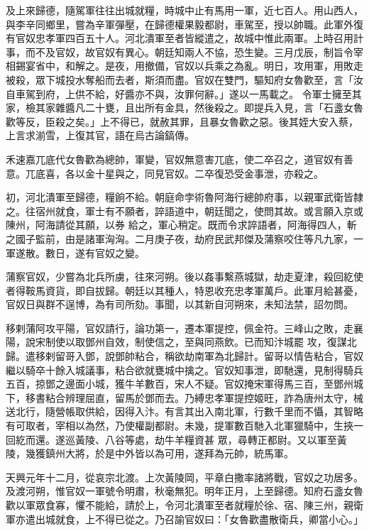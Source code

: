 \begin{pinyinscope}
 及上來歸德，隨駕軍往往出城就糧，時城中止有馬用一軍，近七百人。用山西人，與李辛同鄉里，嘗為辛軍彈壓，在歸德權果毅都尉，車駕至，授以帥職。此軍外復有官奴忠孝軍四百五十人。河北潰軍至者皆縱遣之，故城中惟此兩軍。上時召用計事，而不及官奴，故官奴有異心。朝廷知兩人不協，恐生變。三月戊辰，制旨令宰相錫宴省中，和解之。是夜，用撤備，官奴以兵乘之為亂。明日，攻用軍，用敗走被殺，眾下城投水奪船而去者，斯須而盡。官奴在雙門，驅知府女魯歡至，言「汝自車駕到府，上供不給，好醬亦不與，汝罪何辭。」遂以一馬載之。
 令軍士擁至其家，檢其家雜醬凡二十甕，且出所有金具，然後殺之。即提兵入見，言「石盞女魯歡等反，臣殺之矣。」上不得已，就赦其罪，且暴女魯歡之惡。後其姪大安入蔡，上言求湔雪，上復其官，語在烏古論鎬傳。



 禾速嘉兀底代女魯歡為總帥，軍變，官奴無意害兀底，使二卒召之，道官奴有善意。兀底喜，各以金十星與之，同見官奴。二卒復恐受金事泄，亦殺之。



 初，河北潰軍至歸德，糧餉不給。朝庭命孛術魯阿海行總帥府事，以親軍武衛皆隸之。往宿州就食，軍士有不願者，誶語道中，朝廷聞之，使問其故。或言願入京或陳州，阿海請從其願，以券
 給之，軍心稍定。既而令求誶語者，阿海得四人，斬之國子監前，由是諸軍洶洶。二月庚子夜，劫府民武邦傑及蒲察咬住等凡九家，一軍遂散。數日，遂有官奴之變。



 蒲察官奴，少嘗為北兵所虜，往來河朔。後以姦事繫燕城獄，劫走夏津，殺回紇使者得鞍馬資貨，即自拔歸。朝廷以其種人，特恩收充忠孝軍萬戶。此軍月給甚憂，官奴日與群不逞博，為有司所劾。事聞，以其新自河朔來，未知法禁，詔勿問。



 移剌蒲阿攻平陽，官奴請行，論功第一，遷本軍提控，佩金符。三峰山之敗，走襄陽，說宋制使以取鄧州自效，制使信之，至與同燕飲。已而知汴城罷
 攻，復謀北歸。遣移剌留哥入鄧，說鄧帥粘合，稱欲劫南軍為北歸計。留哥以情告粘合，官奴繼以騎卒十餘入城議事，粘合欲就甕城中擒之。官奴知事泄，即馳還，見制得騎兵五百，掠鄧之邊面小城，獲牛羊數百，宋人不疑。官奴掩宋軍得馬三百，至鄧州城下，移書粘合辨理屈直，留馬於鄧而去。乃縛忠孝軍提控姬旺，詐為唐州太守，械送北行，隨營帳取供給，因得入汴。有言其出入南北軍，行數千里而不懾，其智略有可取者，宰相以為然，乃使權副都尉。未幾，提軍數百馳入北軍獵騎中，生挾一回紇而還。遂巡黃陵、八谷等處，劫牛羊糧資甚
 眾，尋轉正都尉。又以軍至黃陵，幾獲鎮州大將，於是中外皆以為可用，遂拜為元帥，統馬軍。



 天興元年十二月，從哀宗北渡。上次黃陵岡，平章白撒率諸將戰，官奴之功居多。及渡河朔，惟官奴一軍號令明肅，秋毫無犯。明年正月，上至歸德。知府石盞女魯歡以軍眾食寡，懼不能給，請於上，令河北潰軍至者就糧於徐、宿、陳三州，親衛軍亦遣出城就食，上不得已從之。乃召諭官奴曰：「女魯歡盡散衛兵，卿當小心。」




\end{pinyinscope}
